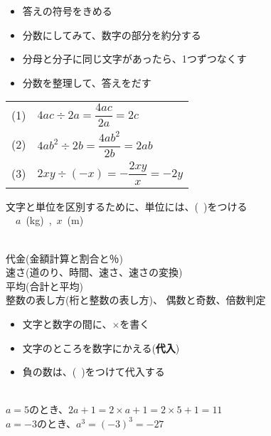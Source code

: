 \documentclass[11pt]{article}
\begin{document}
\begin{tcolorbox}[mybox={文字式の商}]
\begin{itemize}
\item 答えの符号をきめる
\item 分数にしてみて、数字の部分を約分する
\item 分母と分子に同じ文字があったら、1つずつなくす
\item 分数を整理して、答えをだす
\end{itemize}
\end{tcolorbox}


\begin{tabular}{ll}
(1) & $4ac \div 2a = \dfrac{4ac}{2a} =2c$\\
(2) & $4ab^2 \div 2 b = \dfrac{4ab^2}{2b} = 2ab$\\
(3) & $2xy \div (-x) = - \dfrac{2xy}{x} = -2y$\\
\end{tabular}


\begin{tcolorbox}[mybox={文字式と単位、数量の表し方}]
文字と単位を区別するために、単位には、(\ )をつける\\

  \ \ $a$\ (kg)\ ,\ $x$\ (m)
\end{tcolorbox}

\\
代金(金額計算と割合と％)\\
速さ(道のり、時間、速さ、速さの変換)\\
平均(合計と平均)\\
整数の表し方(桁と整数の表し方)、
偶数と奇数、倍数判定\\

\begin{tcolorbox}[mybox={文字への代入、式の値}]
\begin{itemize}
\item 文字と数字の間に、$\times$を書く
\item 文字のところを数字にかえる(\textbf{代入})
\item 負の数は、(\ )をつけて代入する
\end{itemize}
\end{tcolorbox}

\\
$a=5$のとき、$2a+1 = 2 \times a +1 = 2 \times 5 +1 =11$\\
$a=-3$のとき、$a^3 = (-3)^3 = -27$\\
\end{document}
